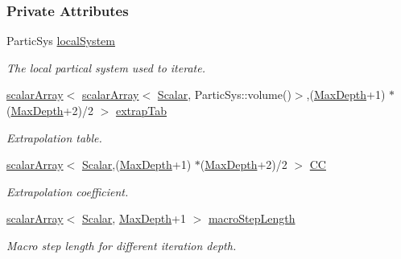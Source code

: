 \subsubsection*{Private Attributes}
\begin{DoxyCompactItemize}
\item 
Partic\+Sys \mbox{\hyperlink{class_b_s_iterator_a9d6fc5f237246465161ea86854985395}{local\+System}}
\begin{DoxyCompactList}\small\item\em The local partical system used to iterate. \end{DoxyCompactList}\item 
\mbox{\hyperlink{class_b_s_iterator_ab0aa7c10b56500273af05dcd85fd8389}{scalar\+Array}}$<$ \mbox{\hyperlink{class_b_s_iterator_ab0aa7c10b56500273af05dcd85fd8389}{scalar\+Array}}$<$ \mbox{\hyperlink{class_b_s_iterator_a7857f8ff9032955ea4dcc22cd18ca7a1}{Scalar}}, Partic\+Sys\+::volume()$>$,(\mbox{\hyperlink{class_b_s_iterator_a39409b9a12d4854d101ce59a0efc0f74}{Max\+Depth}}+1) $\ast$(\mbox{\hyperlink{class_b_s_iterator_a39409b9a12d4854d101ce59a0efc0f74}{Max\+Depth}}+2)/2 $>$ \mbox{\hyperlink{class_b_s_iterator_aa501e973f342248fc445d59a5166ccc9}{extrap\+Tab}}
\begin{DoxyCompactList}\small\item\em Extrapolation table. \end{DoxyCompactList}\item 
\mbox{\hyperlink{class_b_s_iterator_ab0aa7c10b56500273af05dcd85fd8389}{scalar\+Array}}$<$ \mbox{\hyperlink{class_b_s_iterator_a7857f8ff9032955ea4dcc22cd18ca7a1}{Scalar}},(\mbox{\hyperlink{class_b_s_iterator_a39409b9a12d4854d101ce59a0efc0f74}{Max\+Depth}}+1) $\ast$(\mbox{\hyperlink{class_b_s_iterator_a39409b9a12d4854d101ce59a0efc0f74}{Max\+Depth}}+2)/2 $>$ \mbox{\hyperlink{class_b_s_iterator_a28f6cc2fd6bfd554f85225492f4210b7}{CC}}
\begin{DoxyCompactList}\small\item\em Extrapolation coefficient. \end{DoxyCompactList}\item 
\mbox{\hyperlink{class_b_s_iterator_ab0aa7c10b56500273af05dcd85fd8389}{scalar\+Array}}$<$ \mbox{\hyperlink{class_b_s_iterator_a7857f8ff9032955ea4dcc22cd18ca7a1}{Scalar}}, \mbox{\hyperlink{class_b_s_iterator_a39409b9a12d4854d101ce59a0efc0f74}{Max\+Depth}}+1 $>$ \mbox{\hyperlink{class_b_s_iterator_a96c58777cbefe7d02e160317621fc0b9}{macro\+Step\+Length}}
\begin{DoxyCompactList}\small\item\em Macro step length for different iteration depth. \end{DoxyCompactList}\item 

\end{DoxyCompactItemize}
